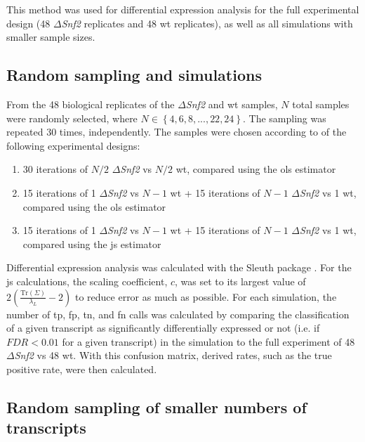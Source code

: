 This method was used for differential expression analysis for the full experimental design (48 $\Delta$\emph{Snf2} replicates and 48 \gls{wt} replicates), as well as all simulations with smaller sample sizes.

\subsection{Random sampling and simulations}

From the 48 biological replicates of the $\Delta$\emph{Snf2} and \gls{wt} samples, $N$ total samples were randomly selected, where $N \in \left\{4, 6, 8, ..., 22, 24 \right\}$.
The sampling was repeated 30 times, independently.
The samples were chosen according to of the following experimental designs:

\begin{enumerate}
  \item 30 iterations of $N/2$ $\Delta$\emph{Snf2} vs $N/2$ \gls{wt}, compared using the \gls{ols} estimator
  \item 15 iterations of 1 $\Delta$\emph{Snf2} vs $N - 1$ \gls{wt} + 15 iterations of $N - 1$ $\Delta$\emph{Snf2} vs 1 \gls{wt}, compared using the \gls{ols} estimator
  \item 15 iterations of 1 $\Delta$\emph{Snf2} vs $N - 1$ \gls{wt} + 15 iterations of $N - 1$ $\Delta$\emph{Snf2} vs 1 \gls{wt}, compared using the \gls{js} estimator
\end{enumerate}

Differential expression analysis was calculated with the Sleuth package \cite{pimentelDifferentialAnalysisRNAseq2017,yiGenelevelDifferentialAnalysis2018}.
For the \gls{js} calculations, the scaling coefficient, $c$, was set to its largest value of $2 \left( \frac{ \text{Tr} (\Sigma) }{\lambda_L} - 2 \right)$ to reduce error as much as possible.
For each simulation, the number of \gls{tp}, \gls{fp}, \gls{tn}, and \gls{fn} calls was calculated by comparing the classification of a given transcript as significantly differentially expressed or not (i.e. if $FDR < 0.01$ for a given transcript) in the simulation to the full experiment of 48 $\Delta$\emph{Snf2} vs 48 \gls{wt}.
With this confusion matrix, derived rates, such as the true positive rate, were then calculated.

\subsection{Random sampling of smaller numbers of transcripts}

